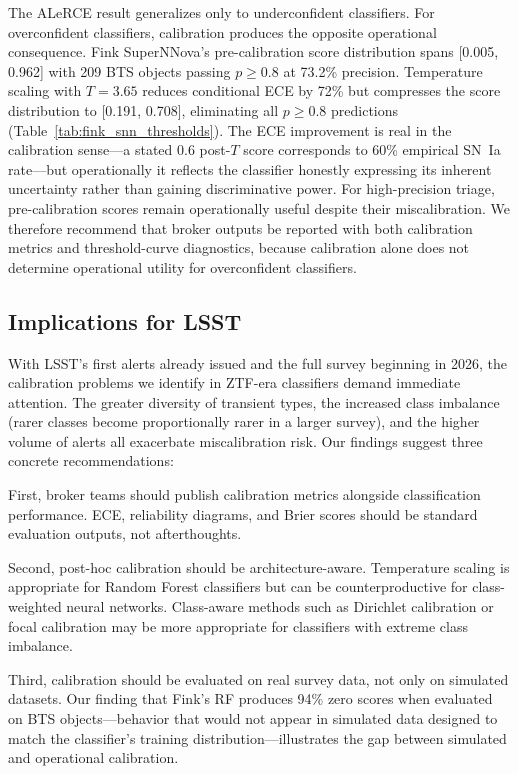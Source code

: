 \documentclass[twocolumn]{aastex631}
\begin{document}
\label{sec:implications}The ALeRCE result generalizes only to underconfident classifiers. For overconfident classifiers, calibration produces the opposite operational consequence. Fink SuperNNova's pre-calibration score distribution spans [0.005, 0.962] with 209 BTS objects passing $p \ge 0.8$ at 73.2\% precision. Temperature scaling with $T = 3.65$ reduces conditional ECE by 72\% but compresses the score distribution to [0.191, 0.708], eliminating all $p \ge 0.8$ predictions (Table~\ref{tab:fink_snn_thresholds}). The ECE improvement is real in the calibration sense---a stated 0.6 post-$T$ score corresponds to 60\% empirical SN~Ia rate---but operationally it reflects the classifier honestly expressing its inherent uncertainty rather than gaining discriminative power. For high-precision triage, pre-calibration scores remain operationally useful despite their miscalibration. We therefore recommend that broker outputs be reported with both calibration metrics and threshold-curve diagnostics, because calibration alone does not determine operational utility for overconfident classifiers.

\subsection{Implications for LSST}

With LSST's first alerts already issued and the full survey beginning in 2026, the calibration problems we identify in ZTF-era classifiers demand immediate attention. The greater diversity of transient types, the increased class imbalance (rarer classes become proportionally rarer in a larger survey), and the higher volume of alerts all exacerbate miscalibration risk. Our findings suggest three concrete recommendations:

First, broker teams should publish calibration metrics alongside classification performance. ECE, reliability diagrams, and Brier scores should be standard evaluation outputs, not afterthoughts.

Second, post-hoc calibration should be architecture-aware. Temperature scaling is appropriate for Random Forest classifiers but can be counterproductive for class-weighted neural networks. Class-aware methods such as Dirichlet calibration \citep{kull2019} or focal calibration \citep{mukhoti2020} may be more appropriate for classifiers with extreme class imbalance.

Third, calibration should be evaluated on real survey data, not only on simulated datasets. Our finding that Fink's RF produces 94\% zero scores when evaluated on BTS objects---behavior that would not appear in simulated data designed to match the classifier's training distribution---illustrates the gap between simulated and operational calibration.
\end{document}
